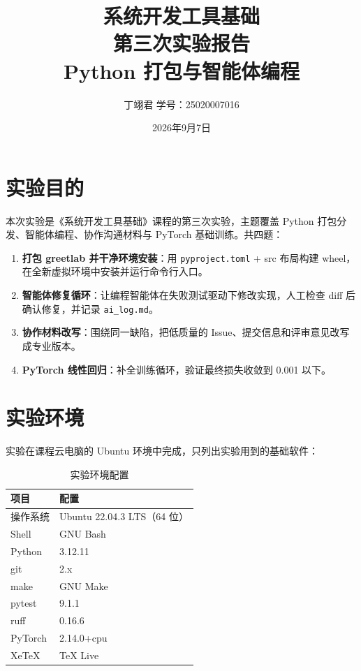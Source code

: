 \documentclass[12pt,a4paper]{article}
\title{\vspace{3cm}\Huge\textbf{系统开发工具基础}\\[0.5cm]
\LARGE 第三次实验报告\\[1cm]
\Large Python 打包与智能体编程}
\author{丁翊君 \quad 学号：25020007016}
\date{2026年9月7日}
\begin{document}
\maketitle
\thispagestyle{empty}
\newpage

\tableofcontents
\newpage

\section{实验目的}

本次实验是《系统开发工具基础》课程的第三次实验，主题覆盖 Python 打包分发、智能体编程、协作沟通材料与 PyTorch 基础训练。共四题：

\begin{enumerate}
    \item \textbf{打包 greetlab 并干净环境安装}：用 \texttt{pyproject.toml} + src 布局构建 wheel，在全新虚拟环境中安装并运行命令行入口。
    \item \textbf{智能体修复循环}：让编程智能体在失败测试驱动下修改实现，人工检查 diff 后确认修复，并记录 \texttt{ai\_log.md}。
    \item \textbf{协作材料改写}：围绕同一缺陷，把低质量的 Issue、提交信息和评审意见改写成专业版本。
    \item \textbf{PyTorch 线性回归}：补全训练循环，验证最终损失收敛到 0.001 以下。
\end{enumerate}

\section{实验环境}

实验在课程云电脑的 Ubuntu 环境中完成，只列出实验用到的基础软件：

\begin{table}[H]
\centering
\caption{实验环境配置}
\begin{tabular}{|l|l|}
\hline
\textbf{项目} & \textbf{配置} \\
\hline
操作系统 & Ubuntu 22.04.3 LTS（64 位） \\
\hline
Shell & GNU Bash \\
\hline
Python & 3.12.11 \\
\hline
git & 2.x \\
\hline
make & GNU Make \\
\hline
pytest & 9.1.1 \\
\hline
ruff & 0.16.6 \\
\hline
PyTorch & 2.14.0+cpu \\
\hline
XeTeX & TeX Live \\
\hline
\end{tabular}
\end{table}
\end{document}
